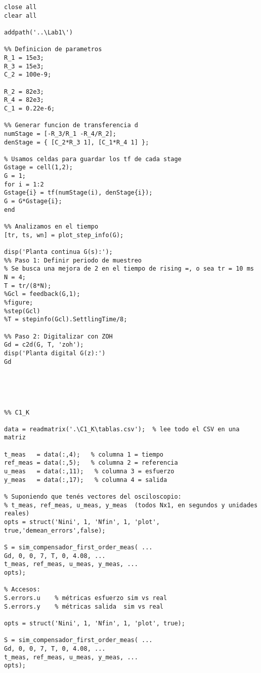 \begin{lstlisting}[style=matlabstyle,caption={Script utilizado para la comparación de las simulaciones con las mediciones de los compensadores.},label={matlab:calculo1}]
close all
clear all

addpath('..\Lab1\')

%% Definicion de parametros
R_1 = 15e3;
R_3 = 15e3;
C_2 = 100e-9;

R_2 = 82e3;
R_4 = 82e3;
C_1 = 0.22e-6;

%% Generar funcion de transferencia d
numStage = [-R_3/R_1 -R_4/R_2];
denStage = { [C_2*R_3 1], [C_1*R_4 1] };

% Usamos celdas para guardar los tf de cada stage
Gstage = cell(1,2);
G = 1;
for i = 1:2
Gstage{i} = tf(numStage(i), denStage{i});
G = G*Gstage{i};
end

%% Analizamos en el tiempo
[tr, ts, wn] = plot_step_info(G);

disp('Planta continua G(s):');
%% Paso 1: Definir periodo de muestreo
% Se busca una mejora de 2 en el tiempo de rising =, o sea tr = 10 ms
N = 4; 
T = tr/(8*N);
%Gcl = feedback(G,1);
%figure;
%step(Gcl)
%T = stepinfo(Gcl).SettlingTime/8;

%% Paso 2: Digitalizar con ZOH
Gd = c2d(G, T, 'zoh');
disp('Planta digital G(z):')
Gd





%% C1_K

data = readmatrix('.\C1_K\tablas.csv');  % lee todo el CSV en una matriz

t_meas   = data(:,4);   % columna 1 = tiempo
ref_meas = data(:,5);   % columna 2 = referencia
u_meas   = data(:,11);   % columna 3 = esfuerzo
y_meas   = data(:,17);   % columna 4 = salida

% Suponiendo que tenés vectores del osciloscopio:
% t_meas, ref_meas, u_meas, y_meas  (todos Nx1, en segundos y unidades reales)
opts = struct('Nini', 1, 'Nfin', 1, 'plot', true,'demean_errors',false);

S = sim_compensador_first_order_meas( ...
Gd, 0, 0, 7, T, 0, 4.08, ...
t_meas, ref_meas, u_meas, y_meas, ...
opts);

% Accesos:
S.errors.u    % métricas esfuerzo sim vs real
S.errors.y    % métricas salida  sim vs real

opts = struct('Nini', 1, 'Nfin', 1, 'plot', true);

S = sim_compensador_first_order_meas( ...
Gd, 0, 0, 7, T, 0, 4.08, ...
t_meas, ref_meas, u_meas, y_meas, ...
opts);


\end{lstlisting}
